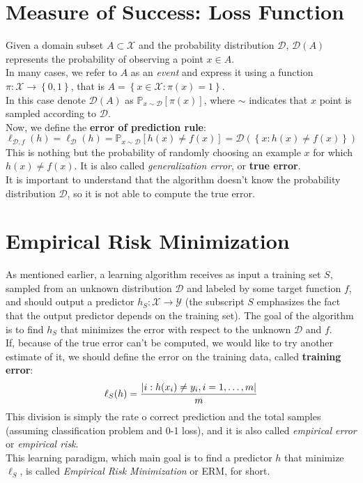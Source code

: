 \documentclass[12pt]{report}
\theoremstyle{plain}
\newcommand\mcl[1]{\mathcal{#1}}
\begin{document}
\begin{flushleft}
\section{Measure of Success: Loss Function}

Given a domain subset $A\subset\mcl{X}$ and the probability distribution $\mcl{D}$, $\mcl{D}(A)$ represents the probability of observing a point $x\in A$.\\
In many cases, we refer to $A$ as an \textit{event} and express it using a function $\pi :\mcl{X}\to\left\{0,1\right\}$, that is $A = \left\{x\in\mcl{X}:\pi(x)=1\right\}$.\\   
In this case denote $\mcl{D}(A)$ as $\mathds{P}_{x\sim\mcl{D}}\left[\pi(x)\right]$, where $\sim$ indicates that $x$ point is sampled according to $\mcl{D}$.\\
Now, we define the \textbf{error of prediction rule}:
\begin{equation}
\ell_{\mcl{D},f}(h) = \ell_\mcl{D}(h) = \mathds{P}_{x\sim\mcl{D}}\left[h(x)\neq f(x)\right] = \mcl{D}\left(\left\{x:h(x)\neq f(x)\right\}\right)
\label{eq:err_pred_rule}
\end{equation}
This is nothing but the probability of randomly choosing an example $x$ for which $h(x)\neq f(x)$. It is also called \textit{generalization error}, or \textbf{true error}.\\
It is important to understand that the algorithm doesn't know the probability distribution $\mcl{D}$, so it is not able to compute the true error. 

\section{Empirical Risk Minimization}

As mentioned earlier, a learning algorithm receives as input a training set $S$, sampled from an unknown distribution $\mcl{D}$ and labeled by some target function $f$, and should output a predictor $h_S:\mcl{X}\to\mcl{Y}$ (the subscript $S$ emphasizes the fact that the output predictor depends on the training set). The goal of the algorithm is to find $h_S$ that minimizes the error with respect to the unknown $\mcl{D}$ and $f$.\\
If, because of the true error can't be computed, we would like to try another estimate of it, we should define the error on the training data, called \textbf{training error}:
\begin{equation}
\ell_S(h) = \frac{\abs{i:h(x_i)\neq y_i , i=1,\dots ,m}}{m}
\label{eq:train_err}
\end{equation}
This division is simply the rate o correct prediction and the total samples (assuming classification problem and 0-1 loss), and it is also called \textit{empirical error} or \textit{empirical risk}.\\
This learning paradigm, which main goal is to find a predictor $h$ that minimize $\ell_S$, is called \textit{Empirical Risk Minimization} or ERM, for short.\\


\end{flushleft}
\end{document}
